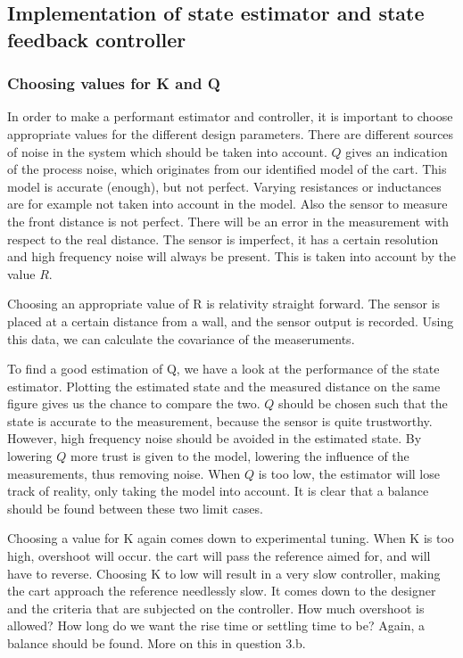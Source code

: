 \documentclass[a4paper]{article}
\newcommand{\newpar}{\vspace{.3cm}\noindent}
\begin{document}
\subsection{Implementation of state estimator and state feedback controller}
\subsubsection{Choosing values for K and Q}

In order to make a performant estimator and controller, it is important to choose appropriate values for the different design parameters. There are different sources of noise in the system which should be taken into account. $Q$ gives an indication of the process noise, which originates from our identified model of the cart. This model is accurate (enough), but not perfect. Varying resistances or inductances are for example not taken into account in the model. Also the sensor to measure the front distance is not perfect. There will be an error in the measurement with respect to the real distance. The sensor is imperfect, it has a certain resolution and high frequency noise will always be present. This is taken into account by the value $R$. 

\newpar
Choosing an appropriate value of R is relativity straight forward. The sensor is placed at a certain distance from a wall, and the sensor output is recorded. Using this data, we can calculate the covariance of the measeruments.

\newpar
To find a good estimation of Q, we have a look at the performance of the state estimator. Plotting the estimated state and the measured distance on the same figure gives us the chance to compare the two. $Q$ should be chosen such that the state is accurate to the measurement, because the sensor is quite trustworthy. However, high frequency noise should be avoided in the estimated state. By lowering $Q$ more trust is given to the model, lowering the influence of the measurements, thus removing noise. When $Q$ is too low, the estimator will lose track of reality, only taking the model into account. It is clear that a balance should be found between these two limit cases.

\newpar
Choosing a value for K again comes down to experimental tuning. When K is too high, overshoot will occur. the cart will pass the reference aimed for, and will have to reverse. Choosing K to low will result in a very slow controller, making the cart approach the reference needlessly slow. It comes down to the designer and the criteria that are subjected on the controller. How much overshoot is allowed? How long do we want the rise time or settling time to be? Again, a balance should be found. More on this in question 3.b. 
\end{document}
